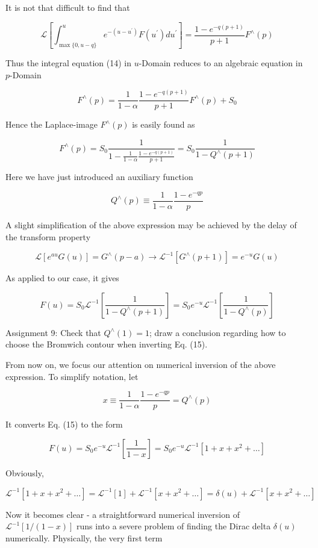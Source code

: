 \documentclass[10pt]{article}
\begin{document}
It is not that difficult to find that

$$
\mathcal{L}\left[\int_{\max \{0, u-q\}}^{u} e^{-\left(u-u^{\prime}\right)} F\left(u^{\prime}\right) d u^{\prime}\right]=\frac{1-e^{-q(p+1)}}{p+1} F^{\wedge}(p)
$$

Thus the integral equation (14) in $u$-Domain reduces to an algebraic equation in $p$-Domain

$$
F^{\wedge}(p)=\frac{1}{1-\alpha} \frac{1-e^{-q(p+1)}}{p+1} F^{\wedge}(p)+S_{0}
$$

Hence the Laplace-image $F^{\wedge}(p)$ is easily found as

$$
F^{\wedge}(p)=S_{0} \frac{1}{1-\frac{1}{1-\alpha} \frac{1-e^{-q(p+1)}}{p+1}}=S_{0} \frac{1}{1-Q^{\wedge}(p+1)}
$$

Here we have just introduced an auxiliary function

$$
Q^{\wedge}(p) \equiv \frac{1}{1-\alpha} \frac{1-e^{-q p}}{p}
$$

A slight simplification of the above expression may be achieved by the delay of the transform property

$$
\mathcal{L}\left[e^{a u} G(u)\right]=G^{\wedge}(p-a) \longrightarrow \mathcal{L}^{-1}\left[G^{\wedge}(p+1)\right]=e^{-u} G(u)
$$

As applied to our case, it gives

$$
F(u)=S_{0} \mathcal{L}^{-1}\left[\frac{1}{1-Q^{\wedge}(p+1)}\right]=S_{0} e^{-u} \mathcal{L}^{-1}\left[\frac{1}{1-Q^{\wedge}(p)}\right]
$$

Assignment 9: Check that $Q^{\wedge}(1)=1$; draw a conclusion regarding how to choose the Bromwich contour when inverting Eq. (15).

From now on, we focus our attention on numerical inversion of the above expression. To simplify notation, let

$$
x \equiv \frac{1}{1-\alpha} \frac{1-e^{-q p}}{p}=Q^{\wedge}(p)
$$

It converts Eq. (15) to the form

$$
F(u)=S_{0} e^{-u} \mathcal{L}^{-1}\left[\frac{1}{1-x}\right]=S_{0} e^{-u} \mathcal{L}^{-1}\left[1+x+x^{2}+\ldots\right]
$$

Obviously,

$$
\mathcal{L}^{-1}\left[1+x+x^{2}+\ldots\right]=\mathcal{L}^{-1}[1]+\mathcal{L}^{-1}\left[x+x^{2}+\ldots\right]=\delta(u)+\mathcal{L}^{-1}\left[x+x^{2}+\ldots\right]
$$

Now it becomes clear - a straightforward numerical inversion of $\mathcal{L}^{-1}[1 /(1-x)]$ runs into a severe problem of finding the Dirac delta $\delta(u)$ numerically. Physically, the very first term
\end{document}
